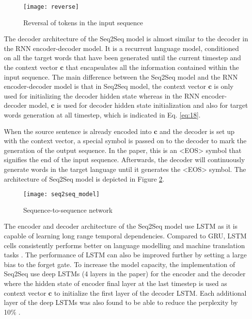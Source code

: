 \documentclass[12pt]{extarticle}
\begin{document}
\begin{figure}[ht]
\centering
\texttt{[image: reverse]}
\caption{Reversal of tokens in the input sequence}
\label{fig:reverse}
\end{figure}

\newpage %
The decoder architecture of the Seq2Seq model is almost similar to the decoder in the RNN encoder-decoder model. It is a recurrent language model, conditioned on all the target words that have been generated until the current timestep and the context vector $\textbf{c}$ that encapsulates all the information contained within the input sequence. The main difference between the Seq2Seq model and the RNN encoder-decoder model is that in Seq2Seq model, the context vector $\textbf{c}$ is only used for initializing the decoder hidden state whereas in the RNN encoder-decoder model, $\textbf{c}$ is used for decoder hidden state initialization and also for target words generation at all timestep, which is indicated in Eq. \ref{eq:18}. 

When the source sentence is already encoded into $\textbf{c}$ and the decoder is set up with the context vector, a special symbol is passed on to the decoder to mark the generation of the output sequence. In the paper, this is an \textless EOS\textgreater{} symbol that signifies the end of the input sequence. Afterwards, the decoder will continuously generate words in the target language until it generates the \textless EOS\textgreater{} symbol. The architecture of Seq2Seq model is depicted in Figure \ref{fig:seq2seq}.

\begin{figure}[ht]
\centering
\texttt{[image: seq2seq\_model]}
\caption{Sequence-to-sequence network}
\label{fig:seq2seq}
\end{figure}

The encoder and decoder architecture of the Seq2Seq model use LSTM as it is capable of learning long range temporal dependencies. Compared to GRU, LSTM cells consistently performs better on language modelling \citep{Jozefowicz:2015:EER:3045118.3045367} and machine translation tasks \citep{britz-etal-2017-massive}. The performance of LSTM can also be improved further by setting a large bias to the forget gate. To increase the model capacity, the implementation of Seq2Seq use deep LSTMs (4 layers in the paper) for the encoder and the decoder where the hidden state of encoder final layer at the last timestep is used as context vector $\textbf{c}$ to initialize the first layer of the decoder LSTM. Each additional layer of the deep LSTMs was also found to be able to reduce the perplexity by 10\% \citep{Sutskever:2014:SSL:2969033.2969173}. 
\end{document}
